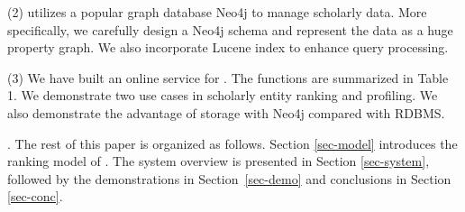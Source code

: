 
\noindent (2) \oursystem utilizes a popular graph database Neo4j to manage scholarly data. More specifically, we carefully design a Neo4j schema and represent the data as a huge property graph. We also incorporate Lucene index to enhance query processing.


\noindent (3) We have built an online service for \oursystem. The functions are summarized in Table 1. We demonstrate two use cases in scholarly entity ranking and profiling. We also demonstrate the advantage of storage with Neo4j compared with RDBMS.



.
The rest of this paper is organized as follows. Section \ref{sec-model} introduces the ranking model of \oursystem. The system overview is presented in Section \ref{sec-system}, followed by the demonstrations in Section~\ref{sec-demo} and conclusions in Section \ref{sec-conc}.

